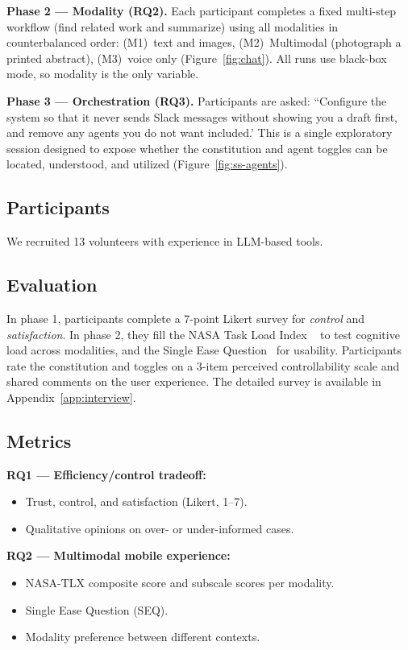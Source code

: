 \documentclass[sigconf, anonymous]{acmart}
\begin{document}
\textbf{Phase 2 --- Modality  (RQ2).} Each participant completes a fixed multi-step workflow (find related work and summarize) using all modalities in counterbalanced order: (M1)~text and images, (M2)~Multimodal (photograph a printed abstract), (M3)~voice only  (Figure~\ref{fig:chat}). All runs use black-box mode, so modality is the only variable.

\textbf{Phase 3 --- Orchestration (RQ3).} Participants are asked: ``Configure the system so that it never sends Slack messages without showing you a draft first, and remove any agents you do not want included.' This is a single exploratory session designed to expose whether the constitution and agent toggles can be located, understood, and utilized (Figure~\ref{fig:ss-agents}).

\subsection{Participants}

We recruited 13 volunteers with experience in LLM-based tools.

\subsection{Evaluation}


In phase 1, participants complete a 7-point Likert survey for  \emph{control} and \emph{satisfaction}. In phase 2, they fill the NASA Task Load Index ~\cite{Hart1988} to test cognitive load across modalities, and the Single Ease Question~\cite{Sauro2009} for usability. Participants rate the constitution and toggles on a 3-item perceived controllability scale and shared comments on the user experience. The detailed survey is available in Appendix~\ref{app:interview}.


\subsection{Metrics}

\textbf{RQ1 --- Efficiency/control tradeoff:}
\begin{itemize}
  \item Trust, control, and satisfaction (Likert, 1--7).
  \item Qualitative opinions on over- or under-informed cases.
\end{itemize}

\textbf{RQ2 --- Multimodal mobile experience:}
\begin{itemize}
  \item NASA-TLX composite score and subscale scores per modality.
  \item Single Ease Question (SEQ).
  \item Modality preference between different contexts.
\end{itemize}
\end{document}
